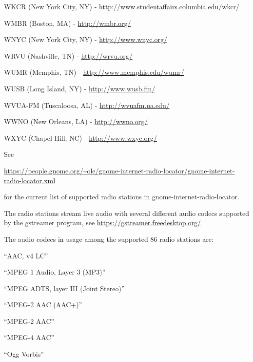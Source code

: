 \documentclass[20pt,landscape]{foils}
\begin{document}
\begin{list1}
\begin{list2}
  \item WKCR (New York City, NY) - \url{http://www.studentaffairs.columbia.edu/wkcr/}
  \item WMBR (Boston, MA) - \url{http://wmbr.org/}
  \item WNYC (New York City, NY) - \url{http://www.wnyc.org/}
  \item WRVU (Nashville, TN) - \url{http://wrvu.org/}
  \item WUMR (Memphis, TN) - \url{http://www.memphis.edu/wumr/}
  \item WUSB (Long Island, NY) - \url{http://www.wusb.fm/}
  \item WVUA-FM (Tuscaloosa, AL) - \url{http://wvuafm.ua.edu/}
  \item WWNO (New Orleans, LA) - \url{http://wwno.org/}
  \item WXYC (Chapel Hill, NC) - \url{http://www.wxyc.org/}
  \end{list2}
\end{list1}

See
\begin{tiny}\url{https://people.gnome.org/~ole/gnome-internet-radio-locator/gnome-internet-radio-locator.xml}\end{tiny} for the current list of supported radio stations in gnome-internet-radio-locator.


The radio stations stream live audio with several different audio codecs supported by the gstreamer program, see \url{https://gstreamer.freedesktop.org/}

The audio codecs in usage among the supported 86 radio stations are:

\begin{list1}
  \item
    \begin{list2}
    \item ``AAC, v4 LC''
    \item ``MPEG 1 Audio, Layer 3 (MP3)''
    \item ``MPEG ADTS, layer III (Joint Stereo)''
    \item ``MPEG-2 AAC (AAC+)''
    \item ``MPEG-2 AAC''
    \item ``MPEG-4 AAC''
    \item ``Ogg Vorbis''
    \end{list2}
\end{list1}

\end{document}
